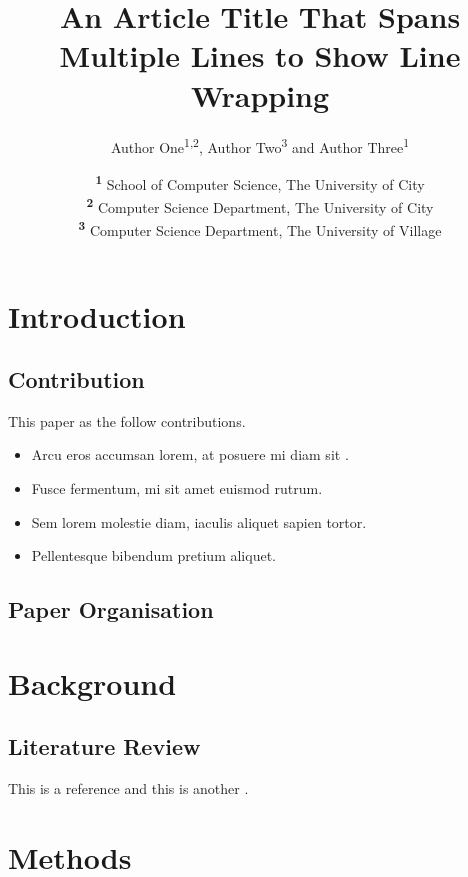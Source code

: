 \documentclass[twocolumn]{NobArticle}
\title{An Article Title That Spans Multiple Lines to Show Line Wrapping}
\author{
    Author One\textsuperscript{1,2}, 
    Author Two\textsuperscript{3} 
    and Author Three\textsuperscript{1}
}
\date{
    \textsuperscript{\textbf{1}}
    School of Computer Science, The University of City \\ \textsuperscript{\textbf{2}}
    Computer Science Department, The University of City \\ \textsuperscript{\textbf{3}}
    Computer Science Department, The University of Village
}
\begin{document}
\small
\maketitle

\section{Introduction}
\blindtext

\subsection{Contribution}
This paper as the follow contributions.

\begin{itemize}
	\item Arcu eros accumsan lorem, at posuere mi diam sit .
	\item Fusce fermentum, mi sit amet euismod rutrum.
	\item Sem lorem molestie diam, iaculis aliquet sapien tortor.
	\item Pellentesque bibendum pretium aliquet.
\end{itemize}

\subsection{Paper Organisation}
\blindtext

\section{Background}
\blindtext

\subsection{Literature Review}
\blindtext This is a reference \citet{Elgamal1985} and this is another \citep{Elgamal1985}.

\section{Methods}
\blindtext

\begin{figure}[!htpb]
    \centering
\end{figure}
\end{document}
